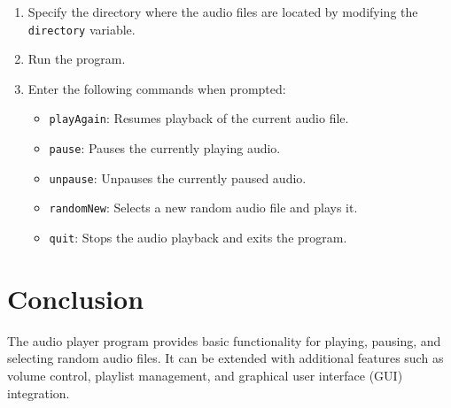 \documentclass{article}
\begin{document}
\begin{enumerate}
  \item Specify the directory where the audio files are located by modifying the \texttt{directory} variable.
  \item Run the program.
  \item Enter the following commands when prompted:
  \begin{itemize}
    \item \texttt{playAgain}: Resumes playback of the current audio file.
    \item \texttt{pause}: Pauses the currently playing audio.
    \item \texttt{unpause}: Unpauses the currently paused audio.
    \item \texttt{randomNew}: Selects a new random audio file and plays it.
    \item \texttt{quit}: Stops the audio playback and exits the program.
  \end{itemize}
\end{enumerate}

\section{Conclusion}
The audio player program provides basic functionality for playing, pausing, and selecting random audio files. It can be extended with additional features such as volume control, playlist management, and graphical user interface (GUI) integration.
\end{document}
